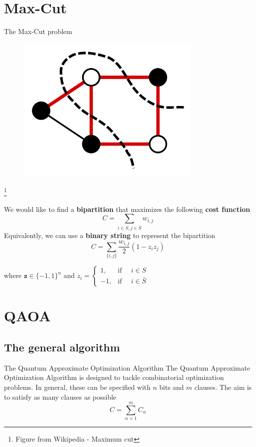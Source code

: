 \documentclass{beamer}
\renewcommand{\vec}[1]{\boldsymbol{#1}}
\newcommand\blfootnote[1]{%
	\begingroup
	\renewcommand\thefootnote{}\footnote{#1}%
	\addtocounter{footnote}{-1}%
	\endgroup
}
\begin{document}
{\section{Max-Cut}
\begin{frame}{The Max-Cut problem}
\begin{figure}
	\centering
	\includegraphics[width=0.8\textwidth]{figures/maxcut}

\end{figure}
\blfootnote{Figure from Wikipedia - Maximum cut}
\end{frame}

\begin{frame}
We would like to find a \textbf{bipartition} that maximizes the following \textbf{cost function}
\begin{equation}
C = \sum_{i\in S, j\in \bar{S}} w_{i,j}
\end{equation}
\pause
Equivalently, we can use a \textbf{binary string} to represent the bipartition
\begin{equation}
C = \sum_{\{i,j\}} \frac{w_{i,j}}{2}(1 - z_i z_j)
\end{equation}

where $\vec{z} \in \{-1,1\}^n$ and $z_i =\begin{cases}
1, & \text{if } \quad i \in S\\
-1, & \text{if } \quad i \in \bar{S}
\end{cases}$
\end{frame}

\section{QAOA}
\subsection{The general algorithm}
\begin{frame}{The Quantum Approximate Optimization Algorithm}
The Quantum Approximate Optimization Algorithm is designed to tackle combinatorial optimization problems. In general, these can be specified with $n$ bits and $m$ clauses. The aim is to satisfy as many clauses as possible
\begin{equation}
C = \sum_{\alpha = 1}^{m} C_{\alpha}
\end{equation}


\end{frame}}
\end{document}

